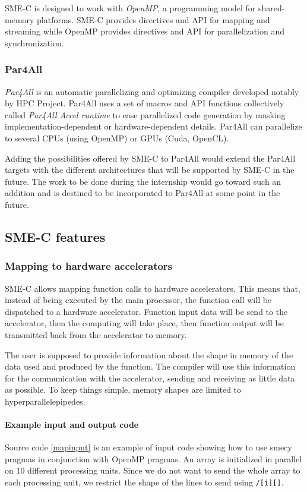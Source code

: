 \documentclass[a4paper]{article}
\begin{document}
	SME-C is designed to work with \emph{OpenMP}, a programming model for shared-memory platforms. SME-C provides directives and API for mapping and streaming while OpenMP provides directives and API for parallelization and synchronization.
	
	\subsubsection{Par4All}
	\emph{Par4All} is an automatic parallelizing and optimizing compiler
    developed notably by HPC Project. Par4All uses a set of macros and API
    functions collectively called \emph{Par4All Accel runtime} to ease
    parallelized code generation by masking implementation-dependent or
    hardware-dependent details. Par4All can parallelize to several CPUs
    (using OpenMP) or GPUs (Cuda, OpenCL).

	Adding the possibilities offered by SME-C to Par4All would extend the Par4All targets with the different architectures that will be supported by SME-C in the future. The work to be done during the internship would go toward such an addition and is destined to be incorporated to Par4All at some point in the future.
	
	\subsection{SME-C features}
	
	\subsubsection{Mapping to hardware accelerators}
	SME-C allows mapping function calls to hardware accelerators. This means that, instead of being executed by the main processor, the function call will be dispatched to a hardware accelerator. Function input data will be send to the accelerator, then the computing will take place, then function output will be transmitted back from the accelerator to memory.
	
	The user is supposed to provide information about the shape in memory of the data used and produced by the function. The compiler will use this information for the communication with the accelerator, sending and receiving as little data as possible. To keep things simple, memory shapes are limited to hyperparallelepipedes.
	
	\paragraph{Example input and output code}
	Source code \ref{mapinput} is an example of input code showing how to use smecy pragmas in conjunction with OpenMP pragmas. An array is initialized in parallel on 10 different processing units. Since we do not want to send the whole array to each processing unit, we restrict the shape of the lines to send using \verb+/[i][]+.
	
\end{document}
